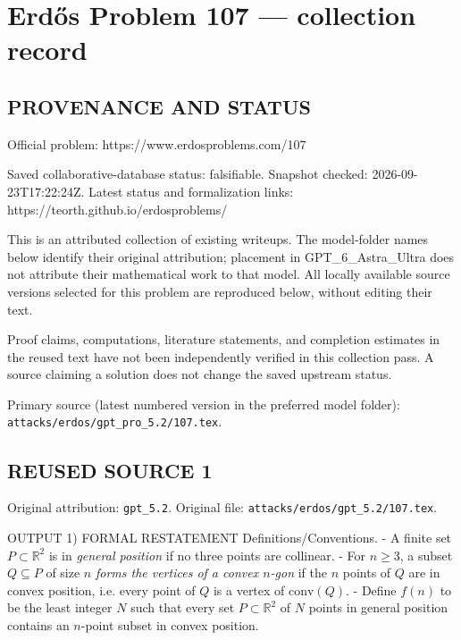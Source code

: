 \section*{Erd\H{o}s Problem 107 --- collection record}

\subsection*{PROVENANCE AND STATUS}
Official problem: https://www.erdosproblems.com/107

Saved collaborative-database status: falsifiable.
Snapshot checked: 2026-09-23T17:22:24Z.
Latest status and formalization links: https://teorth.github.io/erdosproblems/

This is an attributed collection of existing writeups. The model-folder names below identify their original attribution; placement in GPT\_6\_Astra\_Ultra does not attribute their mathematical work to that model. All locally available source versions selected for this problem are reproduced below, without editing their text.

Proof claims, computations, literature statements, and completion estimates in the reused text have not been independently verified in this collection pass. A source claiming a solution does not change the saved upstream status.

Primary source (latest numbered version in the preferred model folder): \texttt{attacks/erdos/gpt\_pro\_5.2/107.tex}.

\subsection*{REUSED SOURCE 1}
Original attribution: \texttt{gpt\_5.2}.
Original file: \texttt{attacks/erdos/gpt\_5.2/107.tex}.


OUTPUT
1) FORMAL RESTATEMENT
Definitions/Conventions.
- A finite set $P\subset\mathbb R^2$ is in \emph{general position} if no three points are collinear.
- For $n\ge 3$, a subset $Q\subseteq P$ of size $n$ \emph{forms the vertices of a convex $n$-gon} if the $n$ points of $Q$ are in convex position, i.e. every point of $Q$ is a vertex of $\mathrm{conv}(Q)$.
- Define $f(n)$ to be the least integer $N$ such that every set $P\subset\mathbb R^2$ of $N$ points in general position contains an $n$-point subset in convex position.

